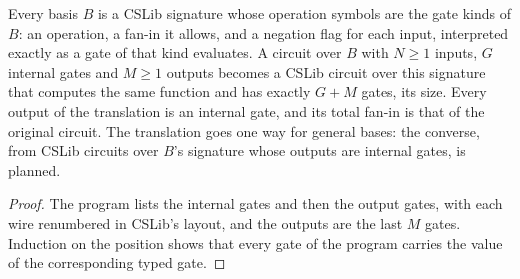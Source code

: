 \begin{theorem}
  \label{thm:circuits-straightline}
  \leanok
  Every basis $B$ is a CSLib signature whose operation symbols are the gate
  kinds of $B$: an operation, a fan-in it allows, and a negation flag for each
  input, interpreted exactly as a gate of that kind evaluates. A circuit over
  $B$ with $N \ge 1$ inputs, $G$ internal gates and $M \ge 1$ outputs becomes a
  CSLib circuit over this signature that computes the same function and has
  exactly $G + M$ gates, its size. Every output of the translation is an
  internal gate, and its total fan-in is that of the original circuit. The
  translation goes one way for general bases: the converse, from CSLib
  circuits over $B$'s signature whose outputs are internal gates, is planned.
\end{theorem}
\begin{proof}
  \leanok
  The program lists the internal gates and then the output gates, with each
  wire renumbered in CSLib's layout, and the outputs are the last $M$ gates.
  Induction on the position shows that every gate of the program carries the
  value of the corresponding typed gate.
\end{proof}

